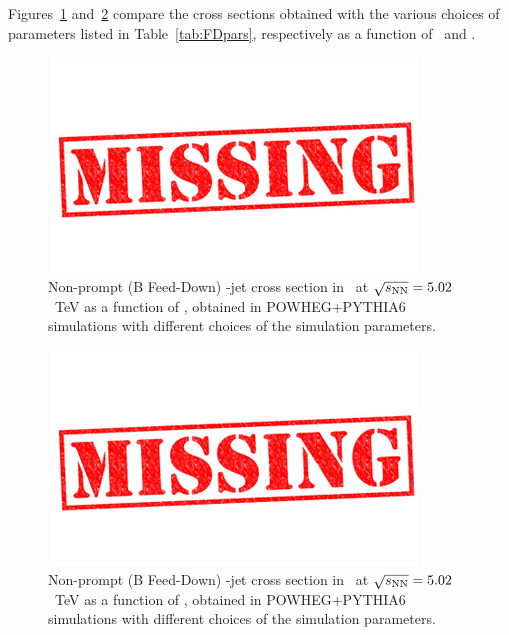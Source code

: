 Figures~\ref{fig:BFeedDown_DPtSpectrum_GeneratorLevel_DPtSpectrum} and~\ref{fig:BFeedDown_JetPtSpectrum_DPt_30_GeneratorLevel_JetPtSpectrum} compare the cross sections obtained with the various choices of parameters listed in Table~\ref{tab:FDpars}, respectively as a function of \ptd\ and \ptchjet. %

\begin{figure}[bth]
\begin{center}
\includegraphics[width=.2\textwidth]{missing}
\caption{Non-prompt (B Feed-Down) \Dstar-jet cross section in \pPb\ at $\sqrt{s_{\rm NN}}=5.02$~TeV as a function of \ptd, obtained in POWHEG+PYTHIA6 simulations
with different choices of the simulation parameters.} 
\label{fig:BFeedDown_DPtSpectrum_GeneratorLevel_DPtSpectrum}
\end{center}
\end{figure}

\begin{figure}[bth]
\begin{center}
\includegraphics[width=.2\textwidth]{missing}
\caption{Non-prompt (B Feed-Down) \Dstar-jet cross section in \pPb\ at $\sqrt{s_{\rm NN}}=5.02$~TeV as a function of \ptchjet, obtained in POWHEG+PYTHIA6 simulations
with different choices of the simulation parameters.} 
\label{fig:BFeedDown_JetPtSpectrum_DPt_30_GeneratorLevel_JetPtSpectrum}
\end{center}
\end{figure}

